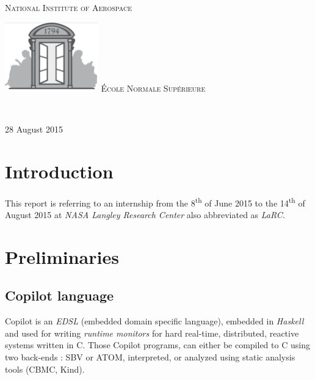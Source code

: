 \documentclass[a4paper,11pt,final]{article}
\begin{document}
\begin{titlepage}
\begin{center}
\begin{minipage}[t]{0.25\textwidth}
\begin{flushleft}
  		  		\textsc{\LARGE National Institute of Aerospace}
	  		\end{flushleft}
  		\end{minipage}
  		\begin{minipage}[t]{0.25\textwidth}
  			\begin{flushleft}
  				\includegraphics[height=30mm]{images/ENS logo.jpg}
  				\textsc{\LARGE École Normale Supérieure}
  			\end{flushleft}
  		\end{minipage} \\[1.5cm]
  		\vfill
  		
  		{\large 28 August 2015}
  		
  	\end{center}
  	
  \end{titlepage}
  
  
  \cleardoublepage %
  \tableofcontents %
  \sloppy          %
  \cleardoublepage
  
  \cleardoublepage
  \section*{Introduction}
  This report is referring to an internship from the 8\textsuperscript{th} of June 2015 to the 14\textsuperscript{th} of August 2015 at \emph{NASA Langley Research Center} also abbreviated as \emph{LaRC}.
  
  
  \section{Preliminaries}
  \subsection{Copilot language}
  Copilot is an \emph{EDSL} (embedded domain specific language), embedded in \emph{Haskell} and used for writing \emph{runtime monitors} for hard real-time, distributed, reactive systems written in C\cite{Copilot01}. Those Copilot programs, can either be compiled to C using two back-ends : SBV or ATOM, interpreted, or analyzed using static analysis tools (CBMC, Kind).
  
\end{document}
